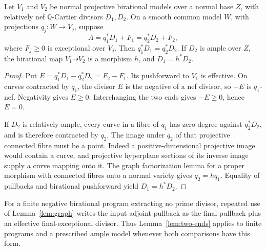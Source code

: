 \begin{lemma}\label{lem:two-ends}
Let $V_1$ and $V_2$ be normal projective birational models over a normal base $Z$, with relatively nef $\mathbb Q$-Cartier divisors $D_1,D_2$. On a smooth common model $W$, with projections $q_j:W\to V_j$, suppose
\[
 A=q_1^*D_1+F_1=q_2^*D_2+F_2,
\]
where $F_j\geq0$ is exceptional over $V_j$. Then
$q_1^*D_1=q_2^*D_2$. If $D_2$ is ample over $Z$, the birational map $V_1\dashrightarrow V_2$ is a morphism $h$, and $D_1=h^*D_2$.
\end{lemma}

\begin{proof}
Put $E=q_1^*D_1-q_2^*D_2=F_2-F_1$. Its pushforward to $V_1$ is effective. On curves contracted by $q_1$, the divisor $E$ is the negative of a nef divisor, so $-E$ is $q_1$-nef. Negativity gives $E\geq0$. Interchanging the two ends gives $-E\geq0$, hence $E=0$.

If $D_2$ is relatively ample, every curve in a fibre of $q_1$ has zero degree against $q_2^*D_2$, and is therefore contracted by $q_2$. The image under $q_2$ of that projective connected fibre must be a point. Indeed a positive-dimensional projective image would contain a curve, and projective hyperplane sections of its inverse image supply a curve mapping onto it. The graph factorization lemma for a proper morphism with connected fibres onto a normal variety gives $q_2=hq_1$. Equality of pullbacks and birational pushforward yield $D_1=h^*D_2$.
\end{proof}

For a finite negative birational program extracting no prime divisor, repeated use of Lemma~\ref{lem:graph} writes the input adjoint pullback as the final pullback plus an effective final-exceptional divisor. Thus Lemma~\ref{lem:two-ends} applies to finite programs and a prescribed ample model whenever both comparisons have this form.

